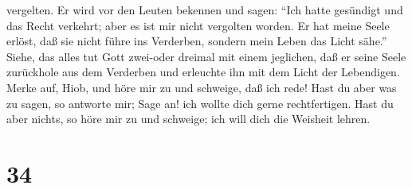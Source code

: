 vergelten.  Er wird vor den Leuten bekennen und sagen:
``Ich hatte gesündigt und das Recht verkehrt; aber es ist mir nicht
vergolten worden.  Er hat meine Seele erlöst, daß sie nicht
führe ins Verderben, sondern mein Leben das Licht sähe.'' 
Siehe, das alles tut Gott zwei-oder dreimal mit einem jeglichen,
 daß er seine Seele zurückhole aus dem Verderben und
erleuchte ihn mit dem Licht der Lebendigen.  Merke auf,
Hiob, und höre mir zu und schweige, daß ich rede!  Hast du
aber was zu sagen, so antworte mir; Sage an! ich wollte dich gerne
rechtfertigen.  Hast du aber nichts, so höre mir zu und
schweige; ich will dich die Weisheit lehren.

\hypertarget{section-33}{%
\section{34}\label{section-33}}

